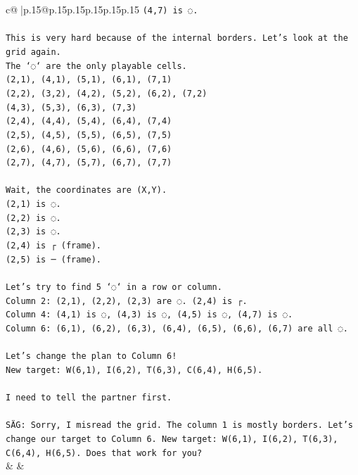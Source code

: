 \documentclass{article}
\begin{document}
{\begin{supertabular}{c@{$\;$}|p{.15\linewidth}@{}p{.15\linewidth}p{.15\linewidth}p{.15\linewidth}p{.15\linewidth}p{.15\linewidth}}
{{{\texttt{(4,7) is ◌.} \\
\\ 
\texttt{This is very hard because of the internal borders. Let's look at the grid again.} \\
\texttt{The `◌` are the only playable cells.} \\
\texttt{(2,1), (4,1), (5,1), (6,1), (7,1)} \\
\texttt{(2,2), (3,2), (4,2), (5,2), (6,2), (7,2)} \\
\texttt{(4,3), (5,3), (6,3), (7,3)} \\
\texttt{(2,4), (4,4), (5,4), (6,4), (7,4)} \\
\texttt{(2,5), (4,5), (5,5), (6,5), (7,5)} \\
\texttt{(2,6), (4,6), (5,6), (6,6), (7,6)} \\
\texttt{(2,7), (4,7), (5,7), (6,7), (7,7)} \\
\\ 
\texttt{Wait, the coordinates are (X,Y).} \\
\texttt{(2,1) is ◌.} \\
\texttt{(2,2) is ◌.} \\
\texttt{(2,3) is ◌.} \\
\texttt{(2,4) is ┌ (frame).} \\
\texttt{(2,5) is ─ (frame).} \\
\\ 
\texttt{Let's try to find 5 `◌` in a row or column.} \\
\texttt{Column 2: (2,1), (2,2), (2,3) are ◌. (2,4) is ┌.} \\
\texttt{Column 4: (4,1) is ◌, (4,3) is ◌, (4,5) is ◌, (4,7) is ◌.} \\
\texttt{Column 6: (6,1), (6,2), (6,3), (6,4), (6,5), (6,6), (6,7) are all ◌.} \\
\\ 
\texttt{Let's change the plan to Column 6!} \\
\texttt{New target: W(6,1), I(6,2), T(6,3), C(6,4), H(6,5).} \\
\\ 
\texttt{I need to tell the partner first.} \\
\\ 
\texttt{SÄG: Sorry, I misread the grid. The column 1 is mostly borders. Let's change our target to Column 6. New target: W(6,1), I(6,2), T(6,3), C(6,4), H(6,5). Does that work for you?} \\
            }
        }
    }
    & & \\ \\


\end{supertabular}}
\end{document}
